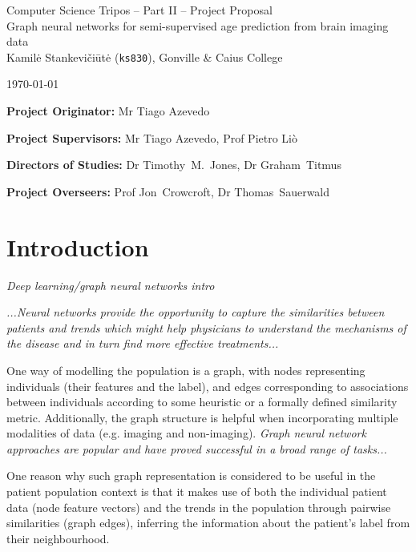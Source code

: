 \documentclass[12pt,a4paper,twoside]{article}
\begin{document}
\begin{center}
\Large
Computer Science Tripos -- Part II -- Project Proposal\\[4mm]
\LARGE
Graph neural networks for semi-supervised age prediction from brain imaging data \\[4mm]

\large
Kamilė Stankevičiūtė (\texttt{ks830}), Gonville \& Caius College

\today %
\end{center}

\vspace{5mm}
\textbf{Project Originator:} Mr Tiago Azevedo

\textbf{Project Supervisors:} Mr Tiago Azevedo, Prof Pietro Liò

\textbf{Directors of Studies:} Dr Timothy~M.~Jones, Dr Graham~Titmus

\textbf{Project Overseers:} Prof Jon~Crowcroft, Dr Thomas~Sauerwald


\section*{Introduction}

\textit{Deep learning/graph neural networks intro}

\textit{...Neural networks provide the opportunity to capture the similarities between patients and trends which might help physicians to understand the mechanisms of the disease and in turn find more effective treatments...}

One way of modelling the population is a graph, with nodes representing individuals (their features and the label), and edges corresponding to associations between individuals according to some heuristic or a formally defined similarity metric. Additionally, the graph structure is helpful when incorporating multiple modalities of data (e.g. imaging and non-imaging). \textit{Graph neural network approaches are popular and have proved successful in a broad range of tasks...}

One reason why such graph representation is considered to be useful in the patient population context is that it makes use of both the individual patient data (node feature vectors) and the trends in the population through pairwise similarities (graph edges), inferring the information about the patient's label from their neighbourhood.
\end{document}

